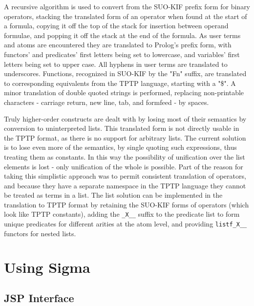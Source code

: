 \documentclass{book}
\begin{document}
A recursive algorithm is used to convert from the SUO-KIF prefix form for binary
operators, stacking the translated form of an operator when found at the start
of a formula, copying it off the top of the stack for insertion between operand
formulae, and popping it off the stack at the end of the formula. As user terms
and atoms are encountered they are translated to Prolog’s prefix form, with
functors’ and predicates’ first letters being set to lowercase, and
variables’ first letters being set to upper case. All hyphens in user terms
are translated to underscores. Functions, recognized in SUO-KIF by the "Fn"
suffix, are translated to corresponding equivalents from the TPTP language,
starting with a "\$". A minor translation of double quoted strings is
performed, replacing non-printable characters - carriage return, new line, tab,
and formfeed - by spaces.

Truly higher-order
constructs are dealt with by losing most of their semantics by conversion to
uninterpreted lists. This translated form is not directly usable in the TPTP
format, as there is no support for arbitrary lists. The current solution is to
lose even more of the semantics, by single quoting such expressions, thus
treating them as constants. In this way the possibility of unification over the
list elements is lost - only unification of the whole is possible. Part of the
reason for taking this simplistic approach was to permit consistent translation
of operators, and because they have a separate namespace in the TPTP language
they cannot be treated as terms in a list. The list solution can be implemented
in the translation to TPTP format by retaining the SUO-KIF forms of operators
(which look like TPTP constants), adding the {\tt \_X\_\_} suffix to the
predicate list to form unique predicates for different arities at the atom
level, and providing {\tt listf\_X\_\_} functors for nested lists.


\chapter{Using Sigma}
\label{chap:UsingSigma}



\section{JSP Interface}
\label{chap:KnowEngi:sec:JSPInterface}
\end{document}
